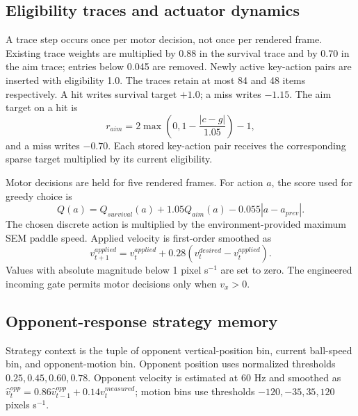 \documentclass[10pt,twocolumn]{article}
\begin{document}
\subsection{Eligibility traces and actuator dynamics}
A trace step occurs once per motor decision, not once per rendered frame. Existing trace weights are multiplied by 0.88 in the survival trace and by 0.70 in the aim trace; entries below 0.045 are removed. Newly active key-action pairs are inserted with eligibility 1.0. The traces retain at most 84 and 48 items respectively. A hit writes survival target $+1.0$; a miss writes $-1.15$. The aim target on a hit is
\begin{equation}
r_{aim}=2\max\left(0,1-\frac{|c-g|}{1.05}\right)-1,
\end{equation}
and a miss writes $-0.70$. Each stored key-action pair receives the corresponding sparse target multiplied by its current eligibility.

Motor decisions are held for five rendered frames. For action $a$, the score used for greedy choice is
\begin{equation}
Q(a)=Q_{survival}(a)+1.05Q_{aim}(a)-0.055|a-a_{prev}|.
\end{equation}
The chosen discrete action is multiplied by the environment-provided maximum SEM paddle speed. Applied velocity is first-order smoothed as
\begin{equation}
v^{applied}_{t+1}=v^{applied}_{t}+0.28\left(v^{desired}_{t}-v^{applied}_{t}\right).
\end{equation}
Values with absolute magnitude below 1 pixel s$^{-1}$ are set to zero. The engineered incoming gate permits motor decisions only when $v_x>0$.

\subsection{Opponent-response strategy memory}
Strategy context is the tuple of opponent vertical-position bin, current ball-speed bin, and opponent-motion bin. Opponent position uses normalized thresholds $0.25,0.45,0.60,0.78$. Opponent velocity is estimated at 60 Hz and smoothed as $\hat v^{opp}_t=0.86\hat v^{opp}_{t-1}+0.14v^{measured}_t$; motion bins use thresholds $-120,-35,35,120$ pixels s$^{-1}$.
\end{document}

